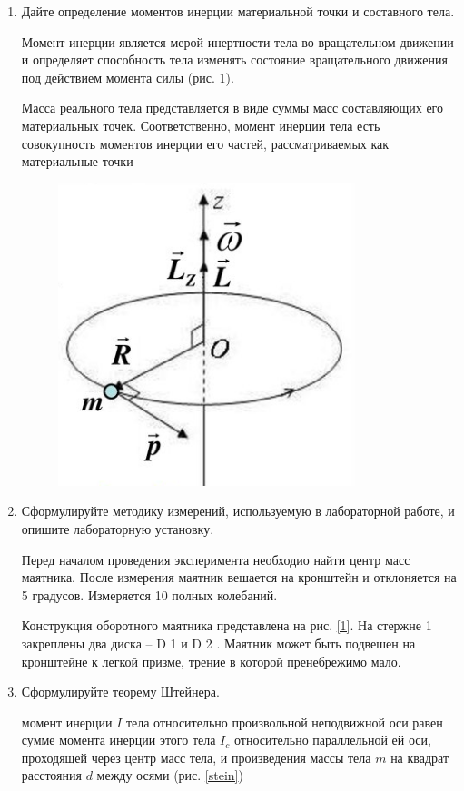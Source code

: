 \documentclass[12pt,a4paper]{article}%
\begin{document}
\begin{enumerate}
	\item Дайте определение моментов инерции материальной точки и составного
	тела.
	
	Момент инерции является мерой инертности тела
	во вращательном движении и определяет способность тела изменять
	состояние вращательного движения под действием момента силы (рис. \ref{mip}).
	
	Масса реального тела представляется в виде суммы масс составляющих
	его материальных точек. Соответственно, момент инерции тела есть
	совокупность моментов инерции его частей, рассматриваемых как
	материальные точки
	
	\begin{figure}[h!]
		\centering
		\includegraphics[width=0.5\linewidth]{pic/mip}
		\caption{}
		\label{mip}
	\end{figure}
	
	\item Сформулируйте методику измерений, используемую в лабораторной работе, и опишите лабораторную установку.
	
	Перед началом проведения эксперимента необходио найти центр масс маятника. После измерения маятник вешается на кронштейн и отклоняется на 5 градусов. Измеряется 10 полных колебаний. 
	
	Конструкция оборотного маятника представлена на
	рис. \ref{1}. На стержне 1 закреплены два диска – D 1 и D 2 . Маятник может быть подвешен на кронштейне к легкой
	призме, трение в которой пренебрежимо мало.
	
	\item Сформулируйте теорему Штейнера.
	
	момент инерции $I$ тела относительно произвольной неподвижной оси равен сумме момента инерции этого тела $I_c$ относительно параллельной ей оси, проходящей через центр масс тела, и произведения массы тела $m$ на квадрат расстояния $d$ между осями (рис. \ref{stein})
	

\end{enumerate}
\end{document}
